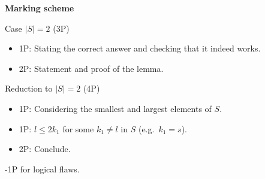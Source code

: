 {\newpage

\textbf{Marking scheme}

Case $\vert S\vert =2$ (3P)
\begin{itemize}
    \item 1P: Stating the correct answer and checking that it indeed works.
    \item 2P: Statement and proof of the lemma.
\end{itemize}

Reduction to $\vert S\vert =2$ (4P)
\begin{itemize}
    \item 1P: Considering the smallest and largest elements of $S$.
    \item 1P: $l\leq 2k_1$ for some $k_1\neq l$ in $S$ (e.g.\ $k_1=s$).
    \item 2P: Conclude.
\end{itemize}
-1P for logical flaws.
}
